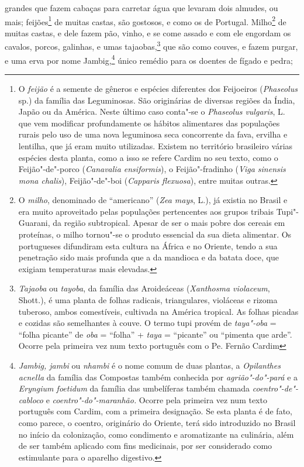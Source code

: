 grandes que fazem cabaças para carretar água que levaram dois almudes,
ou mais; feijões\footnote{ O \textit{feijão} é a semente de gêneros e
espécies diferentes dos Feijoeiros (\textit{Phaseolus} sp.) da família
das Leguminosas. São originárias de diversas regiões da Índia, Japão ou
da América. Neste último caso conta"-se o \textit{Phaseolus vulgaris}, 
L. que vem modificar profundamente os hábitos alimentares das
populações rurais pelo uso de uma nova leguminosa seca concorrente da
fava, ervilha e lentilha, que já eram muito utilizadas. Existem no
território brasileiro várias espécies desta planta, como a isso se
refere Cardim no seu texto, como o Feijão"-de"-porco (\textit{Canavalia
ensiformis}), o Feijão"-fradinho (\textit{Viga sinensis mona chalis}), 
Feijão"-de"-boi (\textit{Capparis flexuosa}), entre muitas outras.} de
muitas castas, são gostosos, e como os de Portugal. Milho\footnote{ O
\textit{milho}, denominado de ``americano'' (\textit{Zea mays}, L.), 
já existia no Brasil e era muito aproveitado pelas populações
pertencentes aos grupos tribais Tupi"-Guarani, da região subtropical.
Apesar de ser o mais pobre dos cereais em proteínas, o milho tornou"-se
o produto essencial da sua dieta alimentar. Os portugueses difundiram
esta cultura na África e no Oriente, tendo a sua penetração sido mais
profunda que a da mandioca e da batata doce, que exigiam temperaturas
mais elevadas.} de muitas castas, e dele fazem pão, vinho, e se come
assado e com ele engordam os cavalos, porcos, galinhas, e umas
tajaobas,\footnote{ \textit{Tajaoba} ou \textit{tayoba}, da família
das Aroideáceas (\textit{Xanthosma violaceum}, Shott.), é uma planta de
folhas radicais, triangulares, violáceas e rizoma tuberoso, ambos
comestíveis, cultivada na América tropical. As folhas picadas e
cozidas são semelhantes à couve. O termo tupi provém de
\textit{taya"-oba} = ``folha picante'' de \textit{oba} = ``folha'' +
\textit{taya} = ``picante'' ou ``pimenta que arde''. Ocorre pela primeira
vez num texto português com o Pe. Fernão Cardim} que são como couves, e
fazem purgar, e uma erva por nome Jambig,\footnote{ \textit{Jambig,
jambi} ou \textit{nhambi} é o nome comum de duas plantas, a
\textit{Opilanthes acnella} da família das Compostas também conhecida
por \textit{agrião"-do"-pará} e a \textit{Eryngium foetidum} da família
das umbelíferas também chamada \textit{coentro"-de"-cabloco} e 
\textit{coentro"-do"-maranhão.} Ocorre pela primeira vez num texto
português com Cardim, com a primeira designação. Se esta planta é de
fato, como parece, o coentro, originário do Oriente, terá sido
introduzido no Brasil no início da colonização, como condimento e
aromatizante na culinária, além de ser também aplicado com fins
medicinais, por ser considerado como estimulante para o aparelho
digestivo.} único remédio para os doentes de fígado e pedra;
